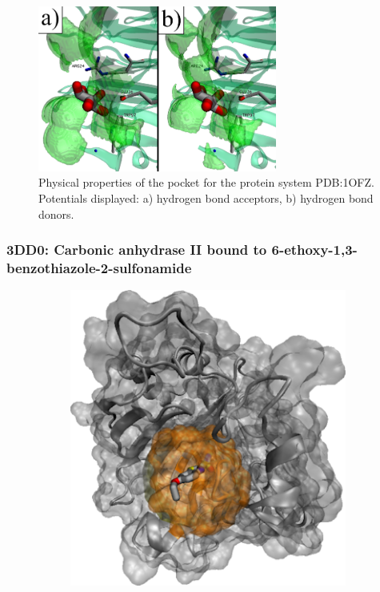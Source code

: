       \begin{figure}[H]
        \centering
        \includegraphics[width=0.7\textwidth]{figures/results/benchmark_prot/1ofz.png}
        \caption{\label{fig:benchmark/1ofz} Physical properties of the pocket for the protein system PDB:1OFZ. Potentials displayed: a) hydrogen bond acceptors, b) hydrogen bond donors.}
      \end{figure}
    \pagebreak

    \subsubsection{3DD0: Carbonic anhydrase II bound to 6-ethoxy-1,3-benzothiazole-2-sulfonamide}
      \begin{figure}[H] \centering
        \begin{subfigure}[c]{0.3\textwidth} \centering
          \includegraphics[width=1\textwidth]{figures/results/ps_prot/3dd0.png}
        \end{subfigure}
        \begin{subfigure}[c]{0.3\textwidth} \centering
        \end{subfigure}
      \end{figure}

